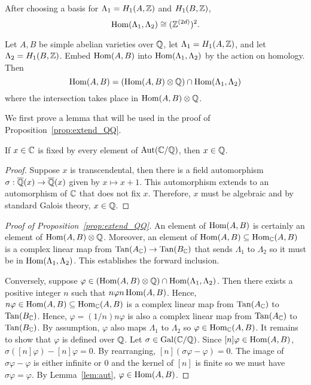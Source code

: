 After choosing a basis for $\Lambda_1 = H_1(A, \mathbb{Z})$ and $H_1(B, \mathbb{Z})$, 
\[
    \operatorname{Hom}(\Lambda_1, \Lambda_2) \cong (\mathbb{Z}^{(2d)})^2.
\]
\begin{proposition}%
    \label{prop:extend_QQ}
    Let $A, B$ be simple abelian varieties over $\mathbb{Q}$, let $\Lambda_1=H_1(A,
    \mathbb{Z})$, and let $\Lambda_2=H_1(B, \mathbb{Z})$. Embed $\operatorname{Hom}(A, B)$ into
    $\operatorname{Hom}(\Lambda_1, \Lambda_2)$ by the action on homology. Then
    \[
        \operatorname{Hom}(A, B) = 
        (\operatorname{Hom}(A, B) \otimes \mathbb{Q})\cap \operatorname{Hom}(\Lambda_1, \Lambda_2)
    \]
    where the intersection takes place in $\operatorname{Hom}(A,B)\otimes \mathbb{Q}$.
\end{proposition}

We first prove a lemma that will be used in the proof of
Proposition~\ref{prop:extend_QQ}.

\begin{lemma}%
    \label{lem:aut}
    If $x\in \mathbb{C}$ is fixed by every element of $\operatorname{Aut}(\mathbb{C}/\mathbb{Q})$, then $x\in
    \mathbb{Q}$.
\end{lemma}
\begin{proof}
    Suppose $x$ is transcendental, then there is a field automorphism
    $\sigma:\overline{\mathbb{Q}}(x)\to\overline{\mathbb{Q}}(x)$ given by $x\mapsto x+1$. This automorphism
    extends to an automorphism of $\mathbb{C}$ that does not fix $x$. Therefore, $x$
    must be algebraic and by standard Galois theory, $x\in \mathbb{Q}$.
\end{proof}

\begin{proof}[Proof of Proposition~\ref{prop:extend_QQ}]
    An element of $\operatorname{Hom}(A, B)$ is certainly an element of $\operatorname{Hom}(A, B)\otimes
    \mathbb{Q}$. Moreover, an element of $\operatorname{Hom}(A, B) \subseteq \operatorname{Hom}_{\mathbb{C}} (A,B)$ is a
    complex linear map from $\operatorname{Tan}(A_{\mathbb{C}})\to \operatorname{Tan}(B_{\mathbb{C}})$ that sends $\Lambda_1$
    to $\Lambda_2$ so it must be in $\operatorname{Hom}(\Lambda_1,\Lambda_2)$. This
    establishes the forward inclusion.

    Conversely, suppose $\varphi\in (\operatorname{Hom}(A, B)\otimes \mathbb{Q})\cap \operatorname{Hom}(\Lambda_1,
    \Lambda_2)$. Then there exists a positive integer $n$ such that $n\varphi n
    \operatorname{Hom}(A, B)$. Hence, $n\varphi\in \operatorname{Hom}(A,B)\subseteq \operatorname{Hom}_{\mathbb{C}}(A, B)$ is a
    complex linear map from $\operatorname{Tan}(A_{\mathbb{C}})$ to $\operatorname{Tan}(B_{\mathbb{C}})$. Hence,
    $\varphi=(1/n)n\varphi$ is also a complex linear map from $\operatorname{Tan}(A_{\mathbb{C}})$ to
    $\operatorname{Tan}(B_{\mathbb{C}})$. By assumption, $\varphi$ also maps $\Lambda_1$ to
    $\Lambda_2$ so $\varphi\in \operatorname{Hom}_{\mathbb{C}}(A,B)$. It remains to show that
    $\varphi$ is defined over $\mathbb{Q}$. Let $\sigma\in \operatorname{Gal}(\mathbb{C}/\mathbb{Q})$. Since
    $[n]\varphi\in \operatorname{Hom}(A,B)$, $\sigma([n]\varphi)-[n]\varphi=0$. By
    rearranging, $[n](\sigma\varphi-\varphi)=0$. The image of
    $\sigma\varphi-\varphi$ is either infinite or 0 and the kernel of $[n]$ is
    finite so we must have $\sigma\varphi=\varphi$. By Lemma~\ref{lem:aut},
    $\varphi\in \operatorname{Hom}(A,B)$.
\end{proof}

